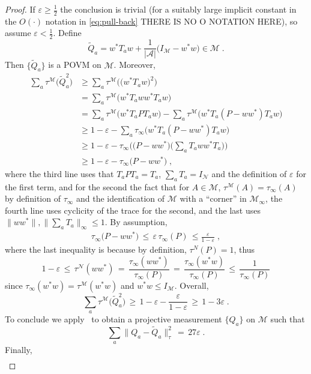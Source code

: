 \documentclass[11pt]{article}
\theoremstyle{definition}
\newcommand{\Id}{\ensuremath{I}}
\newcommand{\mA}{\ensuremath{\mathcal{A}}}
\newcommand{\mM}{\ensuremath{\mathcal{M}}}
\newcommand{\eps}{\varepsilon}
\newcommand{\mN}{\mathcal{N}}
\begin{document}
\begin{proof}
If $\eps\geq \frac{1}{2}$ the conclusion is trivial (for a suitably large implicit constant in the $O(\cdot)$ notation in \eqref{eq:pull-back} {\color{red} THERE IS NO O NOTATION HERE}), so assume $\eps<\frac{1}{2}$. 
Define 
\[\tilde{Q}_a = w^* T_a w  + \frac{1}{|\mA|}\big(\Id_\mM - w^* w\big) \in \mM\;.\]
Then $\{\tilde{Q}_a\}$ is a POVM on $\mM$. Moreover, 
\begin{align*}
\sum_a \tau^\mM \big( \tilde{Q}_a^2 \big) &\geq \sum_a \tau^\mM \big( \big(w^* T_a w \big)^2 \big) \\
&= \sum_a \tau^\mM \big(  w^* T_a w w^*T_a w \big)\\
&= \sum_a \tau^\mM \big(  w^* T_a  P T_a w \big) - \sum_a \tau^\mM \big( w^* T_a  ( P - w w^*) T_a w \big)\\
&\geq 1 - \eps -  \sum_a \tau_\infty \big( w^* T_a  ( P - w w^*) T_a w \big)\\
&\geq 1 - \eps -  \tau_\infty\Big(\big( P - w w^*\big)\Big(\sum_a  T_a w w^* T_a\Big)\Big)\\ 
&\geq 1- \eps- \tau_\infty\big( P- w w^*\big)\;,
\end{align*}
where the third line uses that $T_aPT_a=T_a$, $\sum_a T_a = \Id_\mN$ and the definition of $\eps$ for the first term, and for the second the fact that for $A\in\mM$, $\tau^\mM(A)=\tau_\infty(A)$ by definition of $\tau_\infty$ and the identification of $\mM$ with a ``corner'' in $\mM_\infty$, the fourth line uses cyclicity of the trace for the second, and the last uses $\|ww^*\|,\|\sum_a T_a\|_\infty\leq 1$. By assumption, 
\begin{align*}
\tau_\infty\big( P- w w^*\big) \,\leq\, \eps\, \tau_\infty(P)\,\leq \frac{\eps}{1-\eps}\;,
\end{align*}
where the last inequality is because by definition, $\tau^N(P)=1$, thus
\[1-\eps \,\leq\, \tau^\mN(ww^*) \,=\, \frac{\tau_\infty(ww^*)}{\tau_\infty(P)}\,=\, \frac{\tau_\infty(w^*w)}{\tau_\infty(P)}  \,\leq\, \frac{1}{\tau_\infty(P)}\]
since $\tau_\infty(w^* w) = \tau^\mM(w^* w)$ and $w^*w\leq I_\mM$. Overall, 
\[ \sum_a \tau^\mM \big( \tilde{Q}_a^2 \big) \,\geq\, 1-\eps-\frac{\eps}{1-\eps}\,\geq\, 1-3\eps\;.\]
To conclude we apply~\cite[Theorem 1.2]{de2021orthogonalization} to obtain a projective measurement $\{Q_a\}$ on $\mM$ such that 
\begin{equation*}
\sum_a \big\|{Q}_a - \tilde{Q}_a \big\|^2_\tau \,=\, 27\eps\;.
\end{equation*}
Finally,
\begin{align*}

\end{align*}
\end{proof}
\end{document}
